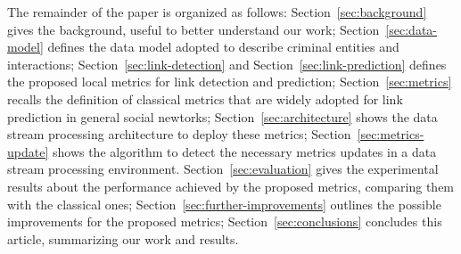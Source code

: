 
The remainder of the paper is organized as follows:
Section~\ref{sec:background} gives the background, useful to better understand our work;
Section~\ref{sec:data-model} defines the data model adopted to describe criminal entities and interactions;
Section~\ref{sec:link-detection} and Section~\ref{sec:link-prediction} defines the proposed local metrics for link detection and prediction;
Section~\ref{sec:metrics} recalls the definition of classical metrics that are widely adopted for link prediction in general social newtorks;
Section~\ref{sec:architecture} shows the data stream processing architecture to deploy these metrics;
Section~\ref{sec:metrics-update} shows the algorithm to detect the necessary metrics updates in a data stream processing environment.
Section~\ref{sec:evaluation} gives the experimental results about the performance achieved by the proposed metrics, comparing them with the classical ones;
Section~\ref{sec:further-improvements} outlines the possible improvements for the proposed metrics;
Section~\ref{sec:conclusions} concludes this article, summarizing our work and results.
